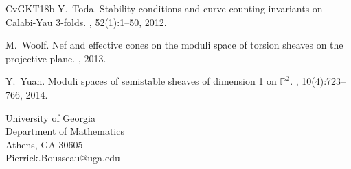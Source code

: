 \documentclass[11pt,letterpaper]{amsart}
\begin{document}
\begin{thebibliography}{CvGKT18b}
Y.~Toda.
\newblock Stability conditions and curve counting invariants on {C}alabi-{Y}au
  3-folds.
, 52(1):1--50, 2012.

M.~Woolf.
\newblock Nef and effective cones on the moduli space of torsion sheaves on the projective plane.
, 2013.

Y.~Yuan.
\newblock Moduli spaces of semistable sheaves of dimension 1 on {$\mathbb{P}^2$}.
, 10(4):723--766, 2014.

\end{thebibliography}



\vspace{+8 pt}
\noindent
University of Georgia \\
Department of Mathematics \\
Athens, GA 30605 \\
Pierrick.Bousseau@uga.edu
\end{document}
